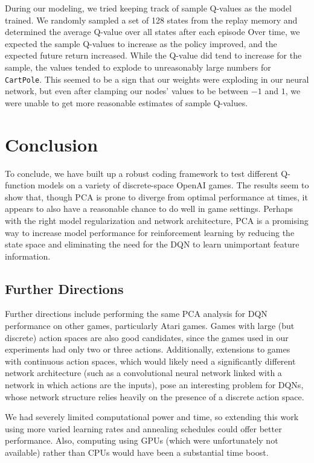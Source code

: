 \documentclass[11pt]{article}
\newcommand{\cp}{\texttt{CartPole}}
\begin{document}
During our modeling, we tried keeping track of sample Q-values as the model trained. We randomly sampled a set of 128 states from the replay memory and determined the average Q-value over all states after each episode Over time, we expected the sample Q-values to increase as the policy improved, and the expected future return increased. While the Q-value did tend to increase for the sample, the values tended to explode to unreasonably large numbers for \cp. This seemed to be a sign that our weights were exploding in our neural network, but even after clamping our nodes' values to be between $-1$ and $1$, we were unable to get more reasonable estimates of sample Q-values. 

\section{Conclusion}

To conclude, we have built up a robust coding framework to test different Q-function models on a variety of discrete-space OpenAI games. The results seem to show that, though PCA is prone to diverge from optimal performance at times, it appears to also have a reasonable chance to do well in game settings. Perhaps with the right model regularization and network architecture, PCA is a promising way to increase model performance for reinforcement learning by reducing the state space and eliminating the need for the DQN to learn unimportant feature information.

\subsection{Further Directions}

Further directions include performing the same PCA analysis for DQN performance on other games, particularly Atari games. Games with large (but discrete) action spaces are also good candidates, since the games used in our experiments had only two or three actions. Additionally, extensions to games with continuous action spaces, which would likely need a significantly different network architecture (such as a convolutional neural network linked with a network in which actions are the inputs), pose an interesting problem for DQNs, whose network structure relies heavily on the presence of a discrete action space.

We had severely limited computational power and time, so extending this work using more varied learning rates and annealing schedules could offer better performance. Also, computing using GPUs (which were unfortunately not available) rather than CPUs would have been a substantial time boost.
\end{document}
